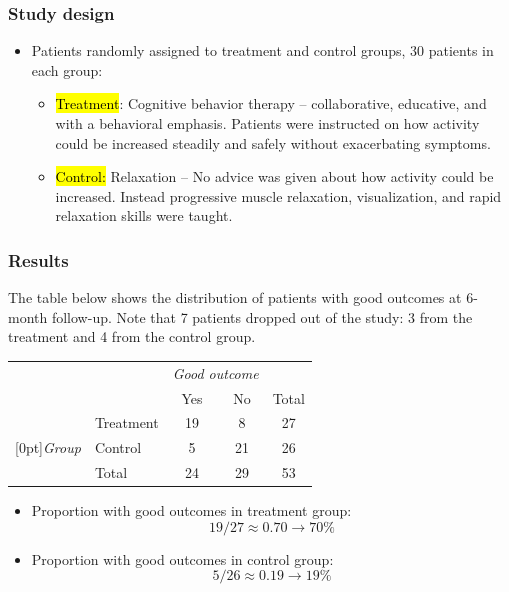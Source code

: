 \documentclass[slidestop,compress,mathserif]{beamer}
\begin{document}

\begin{frame}
\frametitle{Study design}

\begin{itemize}

\item Patients randomly assigned to treatment and control groups, 30 patients in each group:
\begin{itemize}
\item \hl{Treatment}: Cognitive behavior therapy -- collaborative, educative, and with a behavioral emphasis. Patients were instructed on how activity could be increased steadily and safely without exacerbating symptoms.
\item \hl{Control:} Relaxation -- No advice was given about how activity could be increased. Instead progressive muscle relaxation, visualization, and rapid relaxation skills were taught.
\end{itemize}

\end{itemize}

\end{frame}


\begin{frame}
\frametitle{Results}

The table below shows the distribution of patients with good outcomes at 6-month follow-up. Note that 7 patients dropped out of the study: 3 from the treatment and 4 from the control group.

\begin{center}
\begin{tabular}{ll  cc c} 
			&				& \multicolumn{2}{c}{\textit{Good outcome}} \\
\cline{3-4}
			&							& Yes 	& No 	& Total	\\
\cline{2-5}
							&Treatment 	& 19	 	& 8		& 27 	\\
\raisebox{1.5ex}[0pt]{\textit{Group}}	&Control		& 5	 	& 21	 	& 26 \\
\cline{2-5}
							&Total		& 24		& 29		& 53
\end{tabular}
\end{center}

\pause

\begin{itemize}

\item Proportion with good outcomes in treatment group:
\[ 19 / 27 \approx 0.70 \rightarrow 70\% \]

\pause

\item Proportion with good outcomes in control group:
\[ 5 / 26 \approx 0.19 \rightarrow 19\% \]

\end{itemize}

\end{frame}
\end{document}
